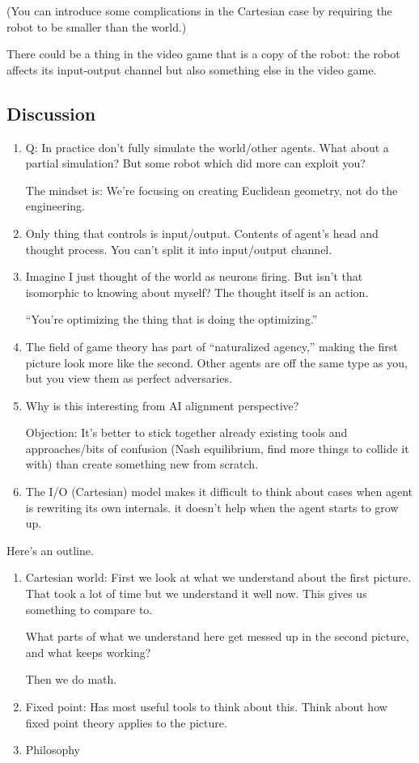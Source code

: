 \documentclass[11pt]{article}
\begin{document}
(You can introduce some complications in the Cartesian case by requiring the robot to be smaller than the world.)

There could be a thing in the video game that is a copy of the robot: the robot affects its input-output channel but also something else in the video game.

\subsection{Discussion}

\begin{enumerate}
\item
Q: In practice don't fully simulate the world/other agents. What about a partial simulation? But some robot which did more can exploit you?

The mindset is: We're focusing on creating Euclidean geometry, not do the engineering.
\item
Only thing that controls is input/output. Contents of agent's head and thought process. You can't split it into input/output channel.
\item
Imagine I just thought of the world as neurons firing.  But isn't that isomorphic to knowing about myself?  The thought itself is an action.

``You're optimizing the thing that is doing the optimizing.''
\item
The field of game theory has part of ``naturalized agency,'' making the first picture look more like the second. Other agents are off the same type as you, but you view them as perfect adversaries. 
\item
Why is this interesting from AI alignment perspective?

Objection: It's better to stick together already existing tools and approaches/bits of confusion (Nash equilibrium, find more things to collide it with) than create something new from scratch.
\item
The I/O (Cartesian) model makes it difficult to think about cases when agent is rewriting its own internals. it doesn't help when the agent starts to grow up.
\end{enumerate}
Here's an outline.
\begin{enumerate}
\item
Cartesian world: 
First we look at what we understand about the first picture. That took a lot of time but we understand it well now. This gives us something to compare to.

What parts of what we understand here get messed up in the second picture, and what keeps working?

Then we do math. 
\item
Fixed point: Has most useful tools to think about this. Think about how fixed point theory applies to the picture.
\item
Philosophy
\end{enumerate}



\end{document}

